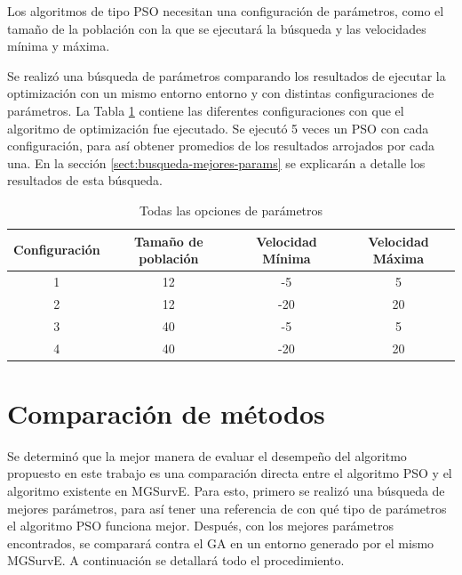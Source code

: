 \documentclass[letterpaper]{report}
\begin{document}
    Los algoritmos de tipo PSO necesitan una configuración de parámetros, como
    el tamaño de la población con la que se ejecutará la búsqueda y las
    velocidades mínima y máxima.

    Se realizó una búsqueda de parámetros comparando los resultados de ejecutar
    la optimización con un mismo entorno entorno y con distintas
    configuraciones de parámetros. La Tabla \ref{table:params-options} contiene
    las diferentes configuraciones con que el algoritmo de
    optimización fue ejecutado. Se ejecutó 5 veces un PSO con cada
    configuración, para así obtener promedios de los resultados arrojados
    por cada una. En la sección \ref{sect:busqueda-mejores-params} se explicarán
    a detalle los resultados de esta búsqueda.

    \begin{table}[ht!]
      \caption{Todas las opciones de parámetros}
      \begin{center}
        \begin{tabular}{|c|c|c|c|}
          \hline
          Configuración & Tamaño de población & Velocidad Mínima & Velocidad Máxima \\
          \hline
          1 & 12 & -5 & 5 \\
          \hline
          2 & 12 & -20 & 20 \\
          \hline
          3 & 40 & -5 & 5 \\
          \hline
          4 & 40 & -20 & 20 \\
          \hline
        \end{tabular}
        \label{table:params-options}
      \end{center}
    \end{table}

  \section{Comparación de métodos}
    
    Se determinó que la mejor manera de evaluar el desempeño del algoritmo
    propuesto en este trabajo es una comparación directa entre el algoritmo PSO 
    y el algoritmo existente en MGSurvE. Para esto, primero se realizó una
    búsqueda de mejores parámetros, para así tener una referencia de con qué
    tipo de parámetros el algoritmo PSO funciona mejor. Después, con los mejores
    parámetros encontrados, se comparará contra el GA en un entorno generado por
    el mismo MGSurvE. A continuación se detallará todo el procedimiento. 
\end{document}
